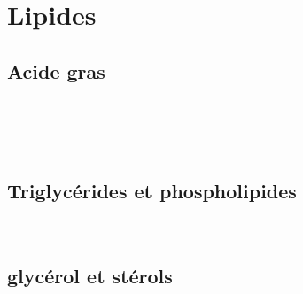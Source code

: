 \section{Lipides}

\subsection{Acide gras}
  
\begin{boiteCodeTex}{}
  \chemfig{!\palmitique} \\[8pt]
  \chemfig{!\linoleique}
  \chemfig{!\linolenique} \\[8pt]
  \chemfig{!\oleique}
  \chemfig{!\arachidonique} \\[8pt]
  \chemfig{!\eicosaPentaenoique}
  \chemfig{!\docosaHexanoique}
\end{boiteCodeTex}

\begin{boiteCodeTex}{}
  \chemfig{!\steraiqueSemiDev}
  \chemfig{!\oleiqueSemiDev}
  \chemfig{!\oleateSemiDev}
  \chemfig{!\caproiqueSemiDev}
\end{boiteCodeTex}
  
\subsection{Triglycérides et phospholipides}

\begin{boiteCodeTex}{}
  \chemfig{!\palmitine} \\
  \chemfig[atom sep = 14pt]{[:60]!\oleine}
  \chemfig[atom sep = 14pt]{!\arachidonine}
\end{boiteCodeTex}
  
\begin{boiteCodeTex}{}
  \chemfig{!\oleineSemiDev}
  \chemfig{!\palmitineSemiDev}
  \chemfig{!\caproineSemiDev}
\end{boiteCodeTex}

\begin{boiteCodeTex}{}
  \chemfig{!\phosphatidylcholine}
\end{boiteCodeTex}

\subsection{glycérol et stérols}

\begin{boiteCodeTex}{}
  \chemfig{!\glycerol} \qq{}
  \chemfig{!\glycerolSemiDev}
\end{boiteCodeTex}
  
